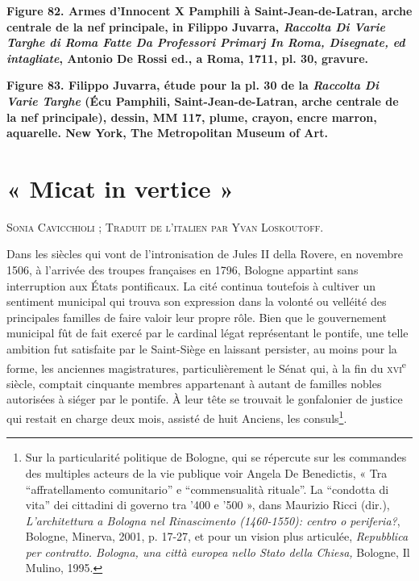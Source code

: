 \documentclass[12pt,twoside,openany]{book}
\newcommand{\PurhContributors}[1]{%
  \par\vspace{0.5\baselineskip}%
  {\normalsize\scshape #1\par}%
  \vspace{0.6\baselineskip}%
}
\begin{document}
\begin{center}
\par\small \textbf{Figure 82. Armes d’Innocent X Pamphili à Saint-Jean-de-Latran, arche centrale de la nef principale, in Filippo Juvarra, \textit{Raccolta Di Varie Targhe di Roma Fatte Da Professori Primarj In Roma, Disegnate, ed intagliate}, Antonio De Rossi ed., a Roma, 1711, pl. 30, gravure.}
\end{center}

\begin{center}
\par\small \textbf{Figure 83. Filippo Juvarra, étude pour la pl. 30 de la \textit{Raccolta Di Varie Targhe }(Écu Pamphili, Saint-Jean-de-Latran, arche centrale de la nef principale), dessin, MM 117, plume, crayon, encre marron, aquarelle. New York, The Metropolitan Museum of Art.}
\end{center}

\chapter{« Micat in vertice »}

\PurhContributors{Sonia Cavicchioli ; Traduit de l’italien par Yvan Loskoutoff.}

Dans les siècles qui vont de l’intronisation de Jules II della Rovere, en novembre 1506, à l’arrivée des troupes françaises en 1796, Bologne appartint sans interruption aux États pontificaux. La cité continua toutefois à cultiver un sentiment municipal qui trouva son expression dans la volonté ou velléité des principales familles de faire valoir leur propre rôle. Bien que le gouvernement municipal fût de fait exercé par le cardinal légat représentant le pontife, une telle ambition fut satisfaite par le Saint-Siège en laissant persister, au moins pour la forme, les anciennes magistratures, particulièrement le Sénat qui, à la fin du \textsc{xvi}\textsuperscript{e} siècle, comptait cinquante membres appartenant à autant de familles nobles autorisées à siéger par le pontife. À leur tête se trouvait le gonfalonier de justice qui restait en charge deux mois, assisté de huit Anciens, les consuls\footnote{Sur la particularité politique de Bologne, qui se répercute sur les commandes des multiples acteurs de la vie publique voir Angela De Benedictis, « Tra “affratellamento comunitario” e “commensualità rituale”. La “condotta di vita” dei cittadini di governo tra ’400 e ’500 », dans Maurizio Ricci (dir.), \textit{L’architettura a Bologna nel Rinascimento (1460-1550): centro o periferia?}, Bologne, Minerva, 2001, p. 17-27, et pour un vision plus articulée, \textit{Repubblica per contratto. Bologna, una città europea nello Stato della Chiesa, }Bologne, Il Mulino, 1995.}.
\end{document}
